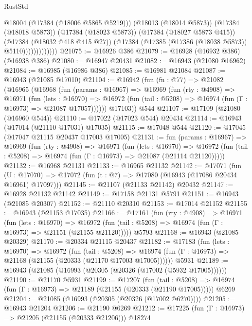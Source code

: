 \begin{lexlean}{RustStd}
\begin{coremodule}
                            @18004
                            (@17384 (@18006 @5865 @5219)))
                          (@18013 (@18014 @5873))
                          (@17384 (@18018 @5873))
                          (@17384 (@18023 @5873))
                          (@17384 (@18027 @5873 @415))
                          (@17384 (@18032 @418 @415 @27))
                          (@17384 (@17385 (@17386 (@18038 @5873)) @5110)))))))))))))
@21075 := @16926 @386
@21079 := @16928 (@16932 @386) (@16938 @386)
@21080 := @16947 @20431
@21082 := @16943 (@21080 @16962)
@21084 := @16985 (@16986 @386)
@21085 := @16981 @21084
@21087 := @16943 (@21085 @17010)
@21104 := @16942
    (fun (fn : @77) =>
    @21082
      (@16965
        (@16968
          (fun (params : @16967) =>
          @16969
            (fun (rty : @4908) =>
            @16971
              (fun (lets : @16970) =>
              @16972 (fun (tail : @5208) => @16974 (fun (Γ : @16973) => @21087 @17057))))))
        @17103))
    @544
@21107 := @17109 (@21080 (@16960 @544))
@21110 := @17022 (@17023 @544) @20434
@21114 := @16943 (@17014 (@21110 @17031) @17035)
@21115 := @17048 @544
@21120 := @17045 (@17047 @21115 @20437 @17003 @17005)
@21131 := fun (params : @16967) =>
  @16969
    (fun (rty : @4908) =>
    @16971
      (fun (lets : @16970) =>
      @16972 (fun (tail : @5208) => @16974 (fun (Γ : @16973) => @21087 (@21114 @21120)))))
@21132 := @16968 @21131
@21133 := @16965 @21132
@21142 := @17071
    (fun (U : @17070) => @17072 (fun (t : @7) => @17080 (@16943 (@17086 @20434 @16961) @17097)))
@21145 := @21107 (@21133 @21142) @20432
@21147 := @16928 @21132 @21142
@21149 := @17158 @21131 @5791
@21151 := @16943 (@21085 @20307)
@21152 := @21110 @20310
@21153 := @17014 @21152
@21155 := @16943 (@21153 @17035)
@21166 := @17161
    (fun (rty : @4908) =>
    @16971
      (fun (lets : @16970) =>
      @16972 (fun (tail : @5208) => @16974 (fun (Γ : @16973) => @21151 (@21155 @21120)))))
    @5793
@21168 := @16943 (@21085 @20329)
@21170 := @20334 @21115 @20437
@21182 := @17183
    (fun (lets : @16970) =>
    @16972
      (fun (tail : @5208) =>
      @16974 (fun (Γ : @16973) => @21168 (@21155 (@20333 (@21170 @17003 @17005))))))
    @5931
@21189 := @16943 (@21085 (@16993 (@20305 (@20326 (@17002 (@5932 @17005))))))
@21190 := @21170 @5931
@21199 := @17207
    (fun (tail : @5208) => @16974 (fun (Γ : @16973) => @21189 (@21155 (@20333 (@21190 @17005)))))
    @6269
@21204 := @21085 (@16993 (@20305 (@20326 (@17002 @6270))))
@21205 := @16943 @21204
@21206 := @21190 @6269
@21212 := @17225 (fun (Γ : @16973) => @21205 (@21155 (@20333 @21206))) @18274

\end{coremodule}
\end{lexlean}
